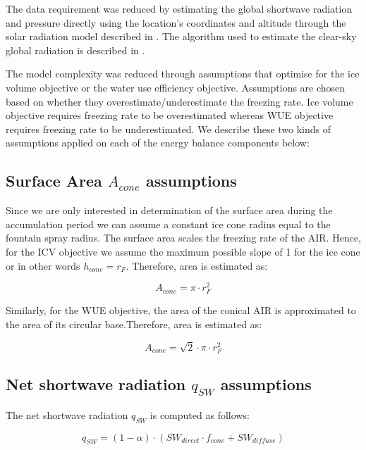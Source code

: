 \documentclass[tc, manuscript]{copernicus}
\begin{document}
The data requirement was reduced by estimating the global shortwave radiation and pressure directly using the
location's coordinates and altitude through the solar radiation model described in
\citet{holmgrenPvlibPythonPython2018}. The algorithm used to estimate the clear-sky global radiation is
described in \citet{ineichenBroadbandSimplifiedVersion2008}.  

The model complexity was reduced through assumptions that optimise for the ice volume objective or the water use
efficiency objective. Assumptions are chosen based on whether they overestimate/underestimate the freezing rate.
Ice volume objective requires freezing rate to be overestimated whereas WUE objective requires freezing rate to
be underestimated. We describe these two kinds of assumptions applied on each of the energy balance components
below: 

\subsection{Surface Area $A_{cone}$ assumptions}

Since we are only interested in determination of the surface area during the accumulation period we can assume a
constant ice cone radius equal to the fountain spray radius. The surface area scales the freezing rate of the
AIR. Hence, for the ICV objective we assume the maximum possible slope of 1 for the ice cone or in other words
$h_{cone} = r_{F}$. Therefore, area is estimated as:  

\begin{equation} A_{cone} =\pi \cdot r_{F}^2 \label{eq:Area} \end{equation}

Similarly, for the WUE objective, the area of the conical AIR is approximated to the area of its circular
base.Therefore, area is estimated as:

\begin{equation} A_{cone} =\sqrt{2} \cdot \pi \cdot r_{F}^2 \label{eq:Area} \end{equation}

\subsection{Net shortwave radiation \texorpdfstring{$q_{SW}$}{Lg} assumptions}
\label{sec:SW}

The net shortwave radiation $q_{SW}$ is computed as follows:

\begin{equation} 
q_{SW} = (1- \alpha) \cdot ( SW_{direct} \cdot f_{cone} + SW_{diffuse})
\label{eqn:SW} 
\end{equation}
\end{document}
